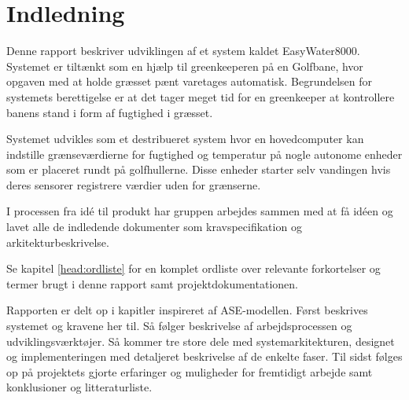 \chapter{Indledning}

Denne rapport beskriver udviklingen af et system kaldet EasyWater8000. Systemet er tiltænkt som en hjælp til greenkeeperen på en Golfbane, hvor opgaven med at holde græsset pænt varetages automatisk. Begrundelsen for systemets berettigelse er at det tager meget tid for en greenkeeper at kontrollere banens stand i form af fugtighed i græsset.

Systemet udvikles som et destribueret system hvor en hovedcomputer kan indstille grænseværdierne for fugtighed og temperatur på nogle autonome enheder som er placeret rundt på golfhullerne. Disse enheder starter selv vandingen hvis deres sensorer registrere værdier uden for grænserne.

I processen fra idé til produkt har gruppen arbejdes sammen med at få idéen og lavet alle de indledende dokumenter som kravspecifikation og arkitekturbeskrivelse.

Se kapitel \ref{head:ordliste} for en komplet ordliste over relevante forkortelser og termer brugt i denne rapport samt projektdokumentationen.

Rapporten er delt op i kapitler inspireret af ASE-modellen. Først beskrives systemet og kravene her til. Så følger beskrivelse af arbejdsprocessen og udviklingsværktøjer.
Så kommer tre store dele med systemarkitekturen, designet og implementeringen med detaljeret beskrivelse af de enkelte faser. Til sidst følges op på projektets gjorte erfaringer og muligheder for fremtidigt arbejde samt konklusioner og litteraturliste.